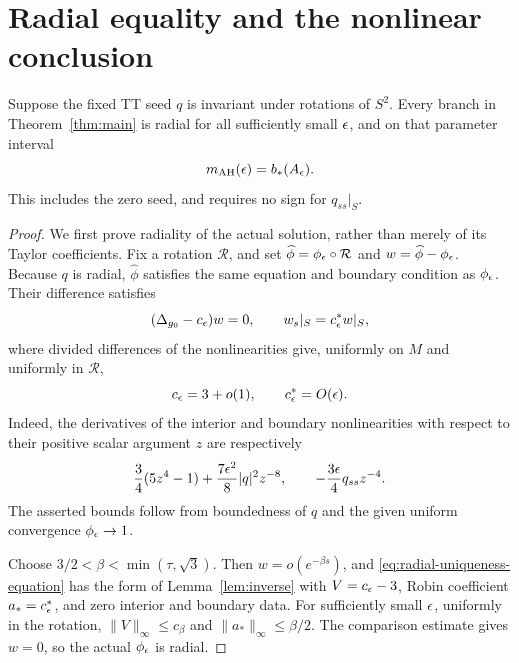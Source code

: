 \section{Radial equality and the nonlinear conclusion}
\label{sec:conclusion}

\begin{proposition}
\label{prop:radial}
Suppose the fixed TT seed $q$ is invariant under rotations of $S^2$.
Every branch in Theorem~\ref{thm:main} is radial for all sufficiently
small $\epsilon$, and on that parameter interval
\[
 m_{\mathrm{AH}}(\epsilon)=b_*(A_\epsilon).
\]
This includes the zero seed, and requires no sign for $q_{ss}|_S$.
\end{proposition}

\begin{proof}
We first prove radiality of the actual solution, rather than merely
of its Taylor coefficients.  Fix a rotation $\mathcal R$, and set
$\widehat\phi=\phi_\epsilon\circ\mathcal R$ and
$w=\widehat\phi-\phi_\epsilon$.
Because $q$ is radial, $\widehat\phi$ satisfies the same equation and
boundary condition as $\phi_\epsilon$.  Their difference satisfies
\begin{equation}
 (\Delta_{g_0}-c_\epsilon)w=0,
 \qquad w_s|_S=c_\epsilon^*w|_S,
 \label{eq:radial-uniqueness-equation}
\end{equation}
where divided differences of the nonlinearities give, uniformly on
$M$ and uniformly in $\mathcal R$,
\[
 c_\epsilon=3+o(1),\qquad c_\epsilon^*=O(\epsilon).
\]
Indeed, the derivatives of the interior and boundary nonlinearities
with respect to their positive scalar argument $z$ are respectively
\[
 \frac34(5z^4-1)+\frac{7\epsilon^2}{8}|q|^2z^{-8},
 \qquad -\frac{3\epsilon}{4}q_{ss}z^{-4}.
\]
The asserted bounds follow from boundedness of $q$ and the given
uniform convergence $\phi_\epsilon\to1$.

Choose $3/2<\beta<\min(\tau,\sqrt3)$. Then
$w=o(e^{-\beta s})$, and \eqref{eq:radial-uniqueness-equation} has the
form of Lemma~\ref{lem:inverse} with $V=c_\epsilon-3$, Robin coefficient
$a_*=c_\epsilon^*$, and zero interior and boundary data. For sufficiently
small $\epsilon$, uniformly in the rotation, $\|V\|_\infty\leq c_\beta$
and $\|a_*\|_\infty\leq\beta/2$. The comparison estimate gives $w=0$,
so the actual $\phi_\epsilon$ is radial.


\end{proof}
